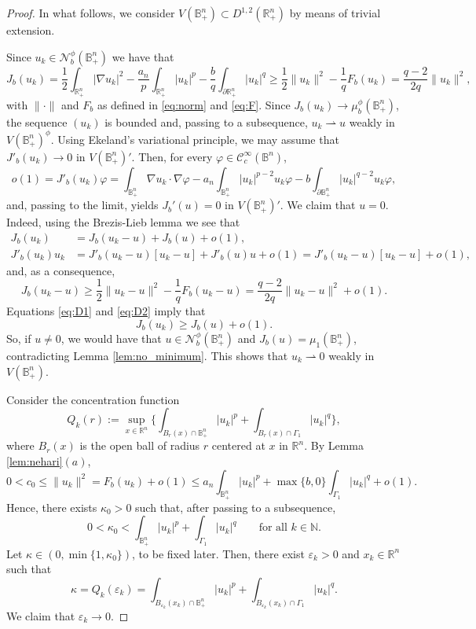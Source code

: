 \documentclass[reqno,11pt,oneside]{amsart}
\numberwithin{equation}{section}
\def\bn{\mathbb{B}^n}
\def\D{\mathbb{B}^n_+}
\def\rn{\mathbb{R}^n}
\def\hn{\mathbb{R}^n_+}
\def\n{\mathbb{N}}
\def\eps{\varepsilon}
\def\rh{\rightharpoonup}
\def\ihn{\int_{\hn}}
\def\idhn{\int_{\partial\hn}}
\def\vp{\varphi}
\def\cC{\mathcal{C}}
\def\cN{\mathcal{N}}
\begin{document}
\begin{proof}
In what follows, we consider $V(\D)\subset D^{1,2}(\hn)$ by means of trivial extension. 

Since $u_k\in\cN_b^\phi(\D)$ we have that
$$J_b(u_k)=\frac{1}{2}\ihn|\nabla u_k|^2 - \frac{a_n}{p}\ihn|u_k|^p - \frac{b}{q}\idhn |u_k|^q\geq\frac{1}{2}\|u_k\|^2 - \frac{1}{q}F_b(u_k)=\frac{q-2}{2q}\|u_k\|^2,$$
with $\|\cdot\|$ and $F_b$ as defined in \eqref{eq:norm} and \eqref{eq:F}. Since $J_b(u_k)\to \mu^\phi_b(\D)$, the sequence $(u_k)$ is bounded and, passing to a subsequence, $u_k\rh u$ weakly in $V(\D)^\phi$. Using Ekeland's variational principle, we may assume that $J'_b(u_k)\to 0$ in $V(\D)'$. Then, for every $\vp\in \cC^\infty_c(\bn)$,
$$o(1)=J'_b(u_k)\vp=\int_{\D}\nabla u_k\cdot\nabla \vp - a_n\int_{\D} |u_k|^{p-2}u_k\vp - b\int_{\partial\D} |u_k|^{q-2}u_k\vp,$$
and, passing to the limit, yields $J_b'(u)=0$ in $V(\D)'$. We claim that $u=0$. Indeed, using the Brezis-Lieb lemma we see that
\begin{align}
J_b(u_k)&=J_b(u_k-u)+J_b(u)+o(1), \label{eq:D1}\\
J'_b(u_k)u_k&=J'_b(u_k-u)[u_k-u]+J'_b(u)u+o(1)=J'_b(u_k-u)[u_k-u]+o(1),\nonumber
\end{align}
and, as a consequence,
\begin{equation}\label{eq:D2}
J_b(u_k-u)\geq\frac{1}{2}\|u_k-u\|^2-\frac{1}{q}F_b(u_k-u)=\frac{q-2}{2q}\|u_k-u\|^2+o(1).
\end{equation}
Equations \eqref{eq:D1} and \eqref{eq:D2} imply that 
\begin{equation}\label{eq:D3}
J_b(u_k)\geq J_b(u)+o(1).
\end{equation}
So, if $u\neq 0$, we would have that $u\in\cN_b^\phi(\D)$ and $J_b(u)=\mu_1(\D)$, contradicting Lemma \ref{lem:no_minimum}. This shows that $u_k\rh 0$ weakly in $V(\D)$. 

Consider the concentration function
$$Q_k(r):=\sup _{x\in\rn}\Big\{\int_{B_r(x)\cap\D}|u_k|^p+\int_{B_r(x)\cap\Gamma_1}|u_k|^q\Big\},$$
where $B_r(x)$ is the open ball of radius $r$ centered at $x$ in $\rn$. By Lemma \ref{lem:nehari}$(a)$, 
$$0<c_0\leq\|u_k\|^2=F_b(u_k)+o(1)\leq a_n\int_{\D}|u_k|^p+\max\{b,0\}\int_{\Gamma_1}|u_k|^q+o(1).$$ 
Hence, there exists $\kappa_0>0$ such that, after passing to a subsequence, 
\begin{equation}\label{eq:kappa0}
0<\kappa_0<\int_{\D}|u_k|^p+\int_{\Gamma_1}|u_k|^q\qquad\text{for all \ }k\in\n.
\end{equation}
Let $\kappa\in (0,\min\{1,\kappa_0\})$, to be fixed later. Then, there exist $\eps_k>0$ and $x_k\in\rn$ such that
\begin{equation} \label{eq:kappa}
\kappa=Q_k(\eps_k)=\int_{B_{\eps_k}(x_k)\cap\D}|u_k|^p+\int_{B_{\eps_k}(x_k)\cap\Gamma_1}|u_k|^q.
\end{equation}
We claim that $\eps_k\to 0$. 


\end{proof}
\end{document}
